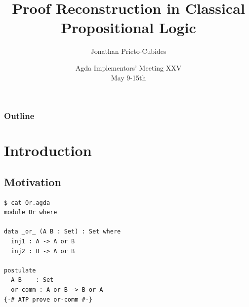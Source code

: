 \documentclass[xetex,hyperref={pdfpagelabels=false}]{beamer}
\title{\textbf{Proof Reconstruction in Classical Propositional Logic}}
\date{Agda Implementors’ Meeting XXV\\
May 9-15th}
\author{Jonathan Prieto-Cubides}
\institute{
Advisor: Andr\'es Sicard-Ram\'irez\\[3mm]
Universidad EAFIT\\
Medell\'in, Colombia}
\begin{document}
\setcounter{page}{1}

\begin{frame}[plain]
\titlepage
\end{frame}


\begin{frame}
  \frametitle{Outline}
  \tableofcontents
\end{frame}

\section{Introduction}
\subsection{Motivation}


\begin{lrbox}{\agdapragma}
\begin{lstlisting}
$ cat Or.agda
module Or where

data _or_ (A B : Set) : Set where
  inj1 : A -> A or B
  inj2 : B -> A or B

postulate
  A B    : Set
  or-comm : A or B -> B or A
{-# ATP prove or-comm #-}
\end{lstlisting}
\end{lrbox}
\end{document}
